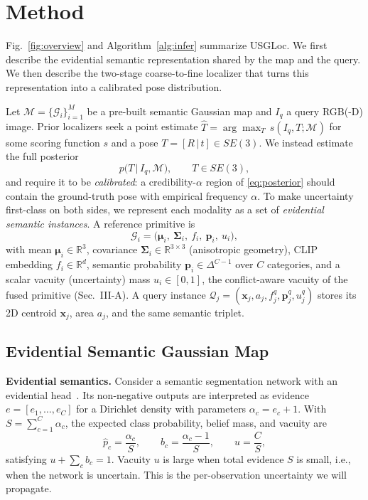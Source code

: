 \documentclass[journal]{IEEEtran}
\newcommand{\method}{USGLoc}
\begin{document}
\section{Method}
Fig.~\ref{fig:overview} and Algorithm~\ref{alg:infer} summarize \method{}. We first describe the evidential semantic representation shared by the map and the query. We then describe the two-stage coarse-to-fine localizer that turns this representation into a calibrated pose distribution.

Let $\mathcal{M}=\{\mathcal{G}_i\}_{i=1}^{M}$ be a pre-built semantic Gaussian map and $I_q$ a query RGB(-D) image. Prior localizers seek a point estimate $\hat{T}=\arg\max_{T} \, s(I_q,T;\mathcal{M})$ for some scoring function $s$ and a pose $T=[R\,|\,t]\in SE(3)$. We instead estimate the full posterior
\begin{equation}
p\big(T \,\big|\, I_q, \mathcal{M}\big), \qquad T\in SE(3),
\label{eq:posterior}
\end{equation}
and require it to be \emph{calibrated}: a credibility-$\alpha$ region of \eqref{eq:posterior} should contain the ground-truth pose with empirical frequency $\alpha$. To make uncertainty first-class on both sides, we represent each modality as a set of \emph{evidential semantic instances}. A reference primitive is
\begin{equation}
\mathcal{G}_i=\big(\bm{\mu}_i,\ \bm{\Sigma}_i,\ f_i,\ \mathbf{p}_i,\ u_i\big),
\label{eq:primitive}
\end{equation}
with mean $\bm{\mu}_i\in\mathbb{R}^3$, covariance $\bm{\Sigma}_i\in\mathbb{R}^{3\times3}$ (anisotropic geometry), CLIP embedding $f_i\in\mathbb{R}^{d}$, semantic probability $\mathbf{p}_i\in\Delta^{C-1}$ over $C$ categories, and a scalar vacuity (uncertainty) mass $u_i\in[0,1]$, the conflict-aware vacuity of the fused primitive (Sec.~III-A). A query instance $\mathcal{Q}_j=(\mathbf{x}_j, a_j, f_j^q, \mathbf{p}_j^q, u_j^q)$ stores its 2D centroid $\mathbf{x}_j$, area $a_j$, and the same semantic triplet.


\subsection{Evidential Semantic Gaussian Map}
\textbf{Evidential semantics.} Consider a semantic segmentation network with an evidential head~\cite{edl}. Its non-negative outputs are interpreted as evidence $e=[e_1,\dots,e_C]$ for a Dirichlet density with parameters $\alpha_c=e_c+1$. With $S=\sum_{c=1}^{C}\alpha_c$, the expected class probability, belief mass, and vacuity are
\begin{equation}
\hat{p}_c=\frac{\alpha_c}{S},\qquad
b_c=\frac{\alpha_c-1}{S},\qquad
u=\frac{C}{S},
\label{eq:edl}
\end{equation}
satisfying $u+\sum_c b_c=1$. Vacuity $u$ is large when total evidence $S$ is small, i.e., when the network is uncertain. This is the per-observation uncertainty we will propagate.
\end{document}
